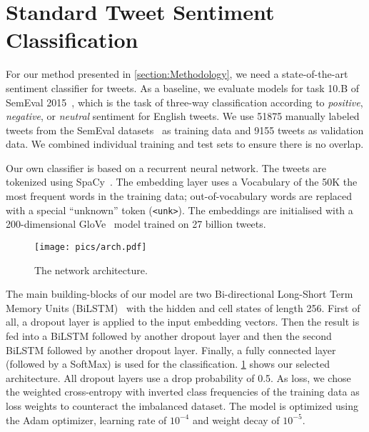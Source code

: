 \documentclass[conference]{IEEEtran}
\begin{document}
\section{Standard Tweet Sentiment Classification}
\label{section:tweet}

For our method presented in \cref{section:Methodology}, we need a state-of-the-art sentiment classifier for tweets. As a baseline, we evaluate models for task 10.B of SemEval 2015~\cite{rosenthal2019semeval2015}, which is the task of three-way classification according to \emph{positive}, \emph{negative}, or \emph{neutral} sentiment for English tweets. We use \num{51875} manually labeled tweets from the SemEval datasets~\cite{nakov-etal-2013-semeval,rosenthal2019semeval2014,rosenthal2019semeval2015,nakov-etal-2016-semeval,rosenthal-etal-2017-semeval} as training data and \num{9155} tweets as validation data.
We combined individual training and test sets to ensure there is no overlap.

Our own classifier is based on a recurrent neural network. The tweets are tokenized using SpaCy~\cite{honnibal-johnson-2015-improved}. The embedding layer uses a Vocabulary of the 50K the most frequent words in the training data; out-of-vocabulary words are replaced with a special ``unknown'' token (\texttt{<unk>}). The embeddings are initialised with a 200-dimensional GloVe~\cite{Pennington14glove:global} model trained on 27 billion tweets.

\begin{figure}[t]
    \centering
        \texttt{[image: pics/arch.pdf]}
    \caption{The network architecture.}
    \label{fig:architecture}
\end{figure}
The main building-blocks of our model are two Bi-directional Long-Short Term Memory Units (BiLSTM)~\cite{hochreiter1997long} with the hidden and cell states of length 256. First of all, a dropout layer is applied to the input embedding vectors. Then the result is fed into a BiLSTM followed by another dropout layer and then the second BiLSTM followed by another dropout layer. Finally, a fully connected layer (followed by a SoftMax) is used for the classification.
\cref{fig:architecture} shows our selected architecture. 
All dropout layers use a drop probability of 0.5.
As loss, we chose the weighted cross-entropy with inverted class frequencies of the training data as loss weights to counteract the imbalanced dataset. The model is optimized using the Adam optimizer, learning rate of $10^{-4}$ and weight decay of $10^{-5}$.
\end{document}
